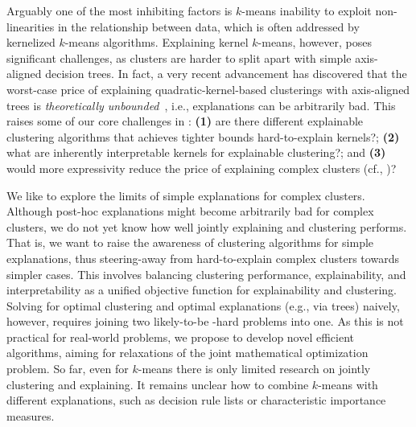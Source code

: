 \documentclass[a4paper,11pt]{article}
\begin{document}
Arguably one of the most inhibiting factors is $k$-means inability to exploit non-linearities in the relationship between data, which is often addressed by kernelized $k$-means algorithms.
Explaining kernel $k$-means, however, poses significant challenges, as clusters are harder to split apart 
with simple axis-aligned decision trees. 
In fact, a very recent advancement has discovered that the worst-case price of explaining quadratic-kernel-based clusterings with axis-aligned trees is \emph{theoretically unbounded}~\cite{fleissner2024explaining}, 
i.e., explanations can be arbitrarily bad. 
This raises some of our core challenges in \rtw:
\textbf{(1)} are there different explainable clustering algorithms that achieves tighter bounds hard-to-explain kernels?;
\textbf{(2)} what are inherently interpretable kernels for explainable clustering?; and
\textbf{(3)} would more expressivity reduce the price of explaining complex clusters (cf., \rto)?

We like to explore the limits of simple explanations for complex clusters.  
Although post-hoc explanations might become arbitrarily bad for complex clusters, we do not yet know how well jointly explaining and clustering performs.
That is, we want to raise the awareness of clustering algorithms for simple explanations, thus steering-away from hard-to-explain complex clusters towards simpler cases.
This involves balancing clustering performance, explainability, and interpretability as a unified objective function for explainability and clustering.
Solving for optimal clustering and optimal explanations (e.g., via trees) naively, however, requires joining two likely-to-be \NP-hard problems into one.
As this is not practical for real-world problems, we propose to develop novel efficient algorithms, aiming for relaxations of the joint mathematical optimization problem.
So far, even for $k$-means there is only limited research on jointly clustering and explaining. 
It remains unclear how to combine $k$-means with different explanations, such as decision rule lists or characteristic importance measures. 
\end{document}
